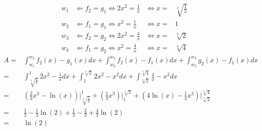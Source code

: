 \documentclass{HM}
\begin{document}
\begin{enumerate}
		\begin{align*}
		w_1 &\Leftarrow f_2=g_1 \Leftrightarrow 2x^2=\frac{1}{x}&\Leftrightarrow x=&\sqrt[3]{\frac{1}{2}}\\
		w_2 &\Leftarrow f_1=g_1 \Leftrightarrow x^2=\frac{1}{x}&\Leftrightarrow x=&1\\
		w_3 &\Leftarrow f_2=g_2 \Leftrightarrow 2x^2=\frac{4}{x}&\Leftrightarrow x=&\sqrt[3]{2}\\
		w_4 &\Leftarrow f_1=g_2\Leftrightarrow x^2=\frac{4}{x}&\Leftrightarrow x=&\sqrt[3]{4}
		\end{align*}
		\begin{align*}
		A=&\int_{w_1}^{w_2}f_2(x)-g_1(x)dx+\int_{w_2}^{w_3}f_2(x)-f_1(x)dx+\int_{w_3}^{w_4}g_2(x)-f_1(x)dx\\
		=&\int_{\sqrt[3]{\tfrac{1}{2}}}^{1}2x^2-\frac{1}{x}dx+\int_{1}^{\sqrt[3]{2}}2x^2-x^2dx+\int_{\sqrt[3]{2}}^{\sqrt[3]{4}}\frac{4}{x}-x^2dx\\
		=&\left(\frac{2}{3}x^3-\ln(x)\right)\biggr|_{\sqrt[3]{\tfrac{1}{2}}}^1+\left(\frac{1}{3}x^3\right)\biggr|_1^{\sqrt[3]{2}}+\left(4\ln(x)-\frac{1}{3}x^3\right)\biggr|_{\sqrt[3]{2}}^{\sqrt[3]{4}}\\
		=&\frac{1}{3}-\frac{1}{3}\ln(2)+\frac{1}{3}-\frac{2}{3}+\frac{4}{3}\ln(2)\\
		=&\ln(2)
		\end{align*}
		

\end{enumerate}
\end{document}
